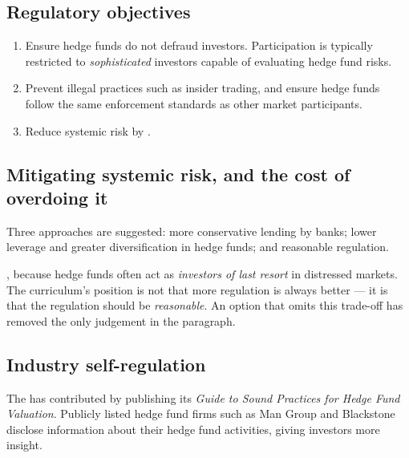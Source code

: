 \subsection{Regulatory objectives}

\begin{enumerate}
\item {} Ensure hedge funds do not defraud investors.
Participation is typically restricted to \emph{sophisticated} investors capable of
evaluating hedge fund risks.
\item {} Prevent illegal practices such as insider trading,
and ensure hedge funds follow the same enforcement standards as other market
participants.
\item {} Reduce systemic risk by .
\end{enumerate}

\subsection{Mitigating systemic risk, and the cost of overdoing it}

Three approaches are suggested:  more conservative lending by banks;
 lower leverage and greater diversification in hedge funds; and
 reasonable regulation.

\begin{imtrapbox}[breakable=false,title={The qualifier on the third one}]
, because hedge
funds often act as \emph{investors of last resort} in distressed markets. The
curriculum's position is not that more regulation is always better --- it is that
the regulation should be \emph{reasonable}. An option that omits this trade-off
has removed the only judgement in the paragraph.
\end{imtrapbox}

\subsection{Industry self-regulation}

The  has contributed by
publishing its \textit{Guide to Sound Practices for Hedge Fund Valuation}.
Publicly listed hedge fund firms such as Man Group and Blackstone disclose
information about their hedge fund activities, giving investors more insight.

